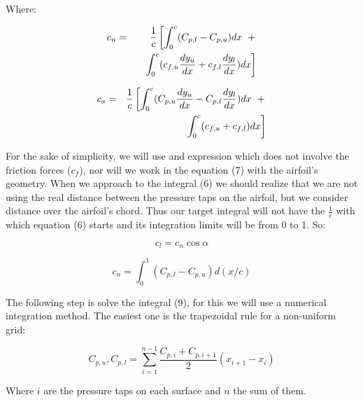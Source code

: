 \documentclass[10pt]{SelfArx} %
\begin{document}
Where:

\begin{eqnarray}\nonumber
c_{n} & = & \frac{1}{c} \left[ \int_{0}^{c} (C_{p, l} - C_{p,u}) dx \hspace{0.2cm} + \right.\\
& & \hspace{0.3cm} \left. \int_{0}^{c} (c_{f, u}\frac{dy_u}{dx}  + c_{f,l}\frac{dy_l}{dx}) dx \right]
\end{eqnarray}

\begin{eqnarray}\nonumber
c_{a} & = & \frac{1}{c} \left [  \int_{0}^{c} (C_{p, u}\frac{dy_u}{dx}  - C_{p,l}\frac{dy_l}{dx}) dx \hspace{0.2cm} + \right.\\  
& & \hspace{0.3cm} \left. \int_{0}^{c} (c_{f, u} + c_{f,l}) dx  \right] \end{eqnarray}

For the sake of simplicity, we will use and expression which does not involve the friction forces ($c_f$), nor will we work in the equation (7) with the airfoil's geometry. When we approach to the integral (6) we should realize that we are not using the real distance between the pressure taps on the airfoil, but we consider distance over the airfoil's chord. Thus our target integral will not have the $\frac{1}{c}$ with which equation (6) starts and its integration limits will be from 0 to 1. So:

\begin{equation} c_{l} = c_{n} \cos{\alpha} \end{equation}

\begin{equation} c_{n} = \int_{0}^{1} (C_{p, l} - C_{p,u}) d(x/c)\end{equation}

The following step is solve the integral (9), for this we will use a numerical integration method. The easiest one is the trapezoidal rule for a non-uniform grid:

\begin{equation} C_{p,u}, C_{p,l} = \sum_{i  =1}^{n-1} \frac{C_{p,i} + C_{p,i+1}}{2} (x_{i + 1} - x_{i}) \end{equation}

Where $i$ are the pressure taps on each surface and $n$ the sum of them.
\end{document}
